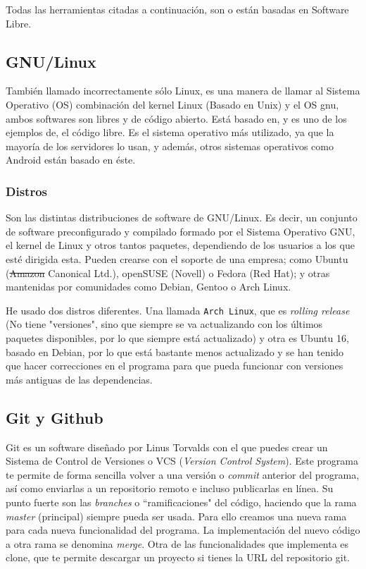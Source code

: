 \documentclass[a4paper, 11pt]{report} %
\begin{document}
Todas las herramientas citadas a continuación, son o están basadas en Software Libre.

\subsection{GNU/Linux}
También llamado incorrectamente sólo Linux, es una manera de llamar al Sistema Operativo (OS) combinación del kernel Linux (Basado en Unix) y el OS \gls{gnu}, ambos softwares son libres y de código abierto. Está basado en, y es uno de los ejemplos de, el código libre. Es el sistema operativo más utilizado, ya que la mayoría de los servidores lo usan, y además, otros sistemas operativos como Android están basado en éste.

\subsubsection{Distros}
Son las distintas distribuciones de software de GNU/Linux. Es decir, un conjunto de software preconfigurado y compilado formado por el Sistema Operativo GNU, el kernel de Linux y otros tantos paquetes, dependiendo de los usuarios a los que esté dirigida esta. Pueden crearse con el soporte de una empresa; como Ubuntu (\sout{Amazon} Canonical Ltd.), openSUSE (Novell) o Fedora (Red Hat); y otras mantenidas por comunidades como Debian, Gentoo o Arch Linux.

He usado dos distros diferentes. Una llamada \texttt{Arch Linux}, que es \textit{rolling release} (No tiene "versiones", sino que siempre se va actualizando con los últimos paquetes disponibles, por lo que siempre está actualizado) y otra es Ubuntu 16, basado en Debian, por lo que está bastante menos actualizado y se han tenido que hacer correcciones en el programa para que pueda funcionar con versiones más antiguas de las \glspl{dependencia}.

\subsection{Git y Github}
Git es un software diseñado por Linus Torvalds con el que puedes crear un Sistema de
Control de Versiones o VCS (\textit{Version Control System}). Este programa te permite
de forma sencilla volver a una versión o \textit{commit} anterior del programa, así
como enviarlas a un \gls{repositorio} remoto e incluso publicarlas en línea. Su punto fuerte
son las \textit{branches} o ``ramificaciones" del código, haciendo que la rama
\textit{master} (principal) siempre pueda ser usada. Para ello creamos una nueva rama para cada nueva funcionalidad del programa. La implementación del nuevo código a otra rama se denomina \textit{merge}. Otra de las funcionalidades que implementa es clone, que te permite descargar un proyecto si tienes la URL del \gls{repositorio} git.
\end{document}

